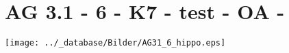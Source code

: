 \section{AG 3.1 - 6 - K7 - test - OA - }

\begin{beispiel}[AG 3.1]{1}
\texttt{[image: ../\_database/Bilder/AG31\_6\_hippo.eps]}
\end{beispiel}